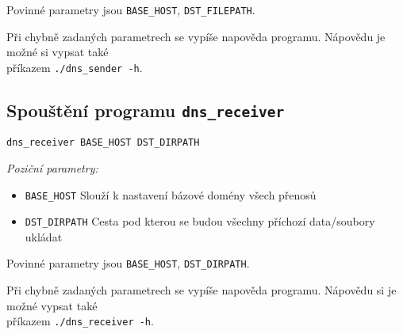 Povinné parametry jsou \texttt{BASE\_HOST}, \texttt{DST\_FILEPATH}.

Při chybně zadaných parametrech se vypíše napověda programu.
Nápovědu je možné si vypsat také \\
příkazem \texttt{./dns\_sender -h}.

\subsection{Spouštění programu \texttt{dns\_receiver}}

\texttt{dns\_receiver {BASE\_HOST} {DST\_DIRPATH}}

\textit{Poziční parametry:}
\begin{itemize}
    \item \texttt{BASE\_HOST} Slouží k nastavení bázové domény všech přenosů
    \item \texttt{DST\_DIRPATH} Cesta pod kterou se budou všechny příchozí data/soubory ukládat
\end{itemize}

Povinné parametry jsou \texttt{BASE\_HOST}, \texttt{DST\_DIRPATH}.

Při chybně zadaných parametrech se vypíše napověda programu.
Nápovědu si je možné vypsat také \\
příkazem \texttt{./dns\_receiver -h}.
